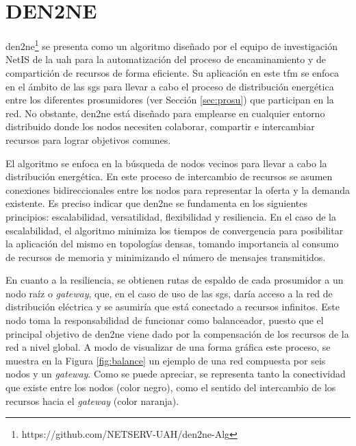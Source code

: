 \section{DEN2NE}
\label{sec:den2ne}

\acrfull{den2ne}\footnote{https://github.com/NETSERV-UAH/den2ne-Alg} \cite{den2ne} \cite{gitden2ne} se presenta como un algoritmo diseñado por el equipo de investigación NetIS de la \gls{uah} para la automatización del proceso de encaminamiento y de compartición de recursos de forma eficiente. Su aplicación en este \gls{tfm} se enfoca en el ámbito de las \gls{sg}s para llevar a cabo el proceso de distribución energética entre los diferentes prosumidores (ver Sección \ref{sec:prosu}) que participan en la red. No obstante, \gls{den2ne} está diseñado para emplearse en cualquier entorno distribuido donde los nodos necesiten colaborar, compartir e intercambiar recursos para lograr objetivos comunes.

\vspace{3mm} 

El algoritmo se enfoca en la búsqueda de nodos vecinos para llevar a cabo la distribución energética. En este proceso de intercambio de recursos se asumen conexiones bidireccionales entre los nodos para representar la oferta y la demanda existente. Es preciso indicar que \gls{den2ne} se fundamenta en los siguientes principios: escalabilidad, versatilidad, flexibilidad y resiliencia. En el caso de la escalabilidad, el algoritmo minimiza los tiempos de convergencia para posibilitar la aplicación del mismo en topologías densas, tomando importancia al consumo de recursos de memoria y minimizando el número de mensajes transmitidos. 

\vspace{3mm}

En cuanto a la resiliencia, se obtienen rutas de espaldo de cada prosumidor a un nodo raíz o \textit{gateway}, que, en el caso de uso de las \gls{sg}s, daría acceso a la red de distribución eléctrica y se asumiría que está conectado a recursos infinitos. Este nodo toma la responsabilidad de funcionar como balanceador, puesto que el principal objetivo de \gls{den2ne} viene dado por la compensación de los recursos de la red a nivel global. A modo de visualizar de una forma gráfica este proceso, se muestra en la Figura \ref{fig:balance} un ejemplo de una red compuesta por seis nodos y un \textit{gateway}. Como se puede apreciar, se representa tanto la conectividad que existe entre los nodos (color negro), como el sentido del intercambio de los recursos hacia el \textit{gateway} (color naranja). 

